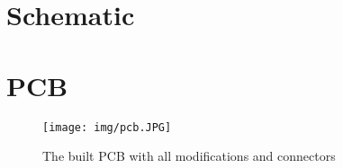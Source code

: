 \appendix

\section{Schematic}



\section{\ac{PCB}}

\begin{figure}[!h]
    \centering
    \texttt{[image: img/pcb.JPG]}
    \caption{The built \ac{PCB} with all modifications and connectors}
    \label{fig:pcb}
\end{figure}
